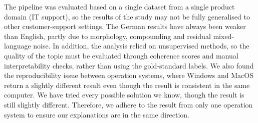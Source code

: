 \documentclass[11pt]{article}
\begin{document}
The pipeline was evaluated based on a single dataset from a single product domain (IT support), so the results of the study may not be fully generalised to other customer-support settings. The German results have always been weaker than English, partly due to morphology, compounding and residual mixed-language noise. In addition, the analysis relied on unsupervised methods, so the quality of the topic must be evaluated through coherence scores and manual interpretability checks, rather than using the gold-standard labels. We also found the reproducibility issue between operation systems, where Windows and MacOS return a slightly different result even though the result is consistent in the same computer. We have tried every possible solution we know, though the result is still slightly different. Therefore, we adhere to the result from only one operation system to ensure our explanations are in the same direction.


\end{document}
